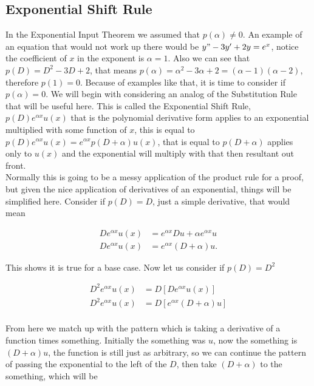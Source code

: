 \documentclass[12pt]{article}
\begin{document}
\subsection{Exponential Shift Rule}

In the Exponential Input Theorem we assumed that $p(\alpha) \neq 0$. An example of an equation that would not work up there would be $y"-3y'+2y=e^x$, notice the coefficient of $x$ in the exponent is $\alpha=1$. Also we can see that $p(D)=D^2-3D+2$, that means $p(\alpha)=\alpha^2-3\alpha+2=(\alpha-1)(\alpha-2)$, therefore $p(1)=0$. Because of examples like that, it is time to consider if $p(\alpha)=0$. We will begin with considering an analog of the Substitution Rule that will be useful here. This is called the Exponential Shift Rule, $p(D)e^{\alpha x}u(x)$ that is the polynomial derivative form applies to an exponential multiplied with some function of $x$, this is equal to $p(D)e^{\alpha x}u(x)=e^{\alpha x}p(D+\alpha)u(x)$, that is equal to $p(D+\alpha)$ applies only to $u(x)$ and the exponential will multiply with that then resultant out front. \\

Normally this is going to be a messy application of the product rule for a proof, but given the nice application of derivatives of an exponential, things will be simplified here. Consider if $p(D)=D$, just a simple derivative, that would mean

\begin{align*}
    De^{\alpha x}u(x)&=e^{\alpha x}Du+ \alpha e^{\alpha x} u\\
    De^{\alpha x}u(x)&=e^{\alpha x}(D+ \alpha) u.
\end{align*}

This shows it is true for a base case. Now let us consider if $p(D)=D^2$

\begin{align*}
    D^2e^{\alpha x}u(x)&=D[De^{\alpha x}u(x)] \\
    D^2e^{\alpha x}u(x)&=D[e^{\alpha x}(D+ \alpha) u] \\
\end{align*}

From here we match up with the pattern which is taking a derivative of a function times something. Initially the something was $u$, now the something is $(D+\alpha)u$, the function is still just as arbitrary, so we can continue the pattern of passing the exponential to the left of the $D$, then take $(D+\alpha)$ to the something, which will be
\end{document}
